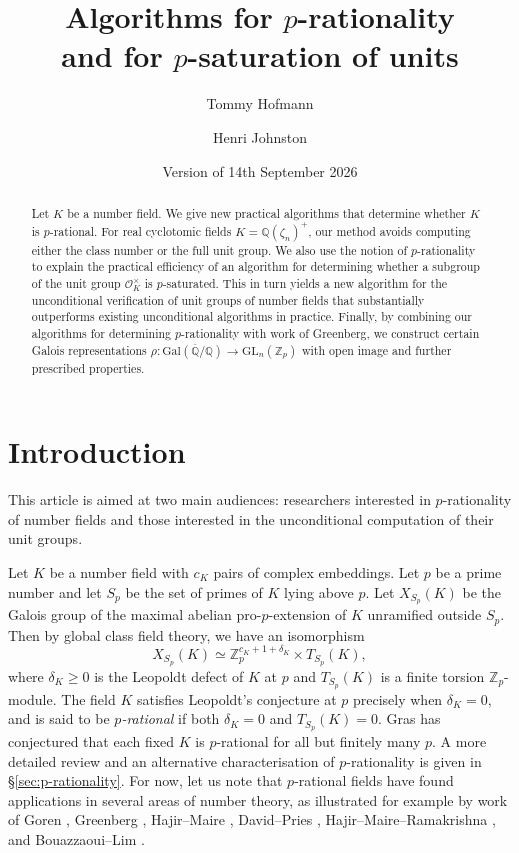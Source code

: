 \documentclass[12pt, a4paper, usenames]{amsart}
\title[Algorithms for $p$-rationality and for $p$-saturation of units]{Algorithms for $p$-rationality\\ and for $p$-saturation of units}
\author{Tommy Hofmann}
\author{Henri Johnston}
\date{Version of 14th September 2026}
\newcommand{\Z}{\mathbb{Z}}
\theoremstyle{plain}
\theoremstyle{remark}
\theoremstyle{definition}
\begin{document}
\maketitle

\begin{abstract}
Let $K$ be a number field.
We give new practical algorithms that determine whether
$K$ is $p$-rational. 
For real cyclotomic fields $K=\mathbb{Q}(\zeta_{n})^{+}$,
our method avoids
computing either the class number or the full unit group. 
We also use the notion of $p$-rationality to explain
the practical efficiency of an algorithm
for determining whether a subgroup 
of the unit group $\mathcal{O}_{K}^{\times}$ is $p$-saturated.
This in turn yields a new algorithm for the unconditional verification
of unit groups of number fields that substantially 
outperforms existing unconditional algorithms
in practice.
Finally, by combining 
our algorithms for determining $p$-rationality with work 
of Greenberg, we construct certain Galois representations 
$\rho : \mathrm{Gal}(\overline{\mathbb{Q}}/\mathbb{Q}) 
\rightarrow \mathrm{GL}_{n}(\mathbb{Z}_{p})$
with open image and further prescribed properties.
\end{abstract}

\section{Introduction}

This article is aimed at two main audiences: researchers interested in $p$-rationality of number fields and those interested in the unconditional computation of their unit groups.

Let $K$ be a number field with $c_{K}$ pairs of complex embeddings.
Let $p$ be a prime number and let $S_{p}$ be the set of primes of $K$ lying above $p$.
Let $X_{S_{p}}(K)$ be the Galois group of the maximal abelian pro-$p$-extension
of $K$ unramified outside $S_{p}$. Then by global class field theory,
we have an isomorphism
\[
X_{S_{p}}(K) \simeq \Z_{p}^{c_{K} + 1 + \delta_{K}} \times T_{S_{p}}(K),
\]
where $\delta_{K} \geq 0$ is the Leopoldt defect of $K$ at $p$ and
$T_{S_{p}}(K)$ is a finite torsion $\Z_{p}$-module. 
The field $K$ satisfies Leopoldt's conjecture at $p$ precisely
when $\delta_{K}=0$, and is said to be \emph{$p$-rational}
if both $\delta_{K}=0$ and $T_{S_{p}}(K)=0$. 
Gras \cite{MR3492629} has conjectured that each fixed $K$ is $p$-rational for all but 
finitely many $p$.
A more detailed review and an alternative characterisation of $p$-rationality 
is given in \S \ref{sec:p-rationality}.
For now, let us note that $p$-rational fields have found applications in several
areas of number theory, as illustrated for example by work of
Goren \cite{MR1826497}, Greenberg \cite{MR3512524}, Hajir--Maire \cite{MR3933912}, David--Pries \cite{MR4083092}, Hajir--Maire--Ramakrishna \cite{MR4308183}, and
Bouazzaoui--Lim \cite{MR4973192}.
\end{document}
